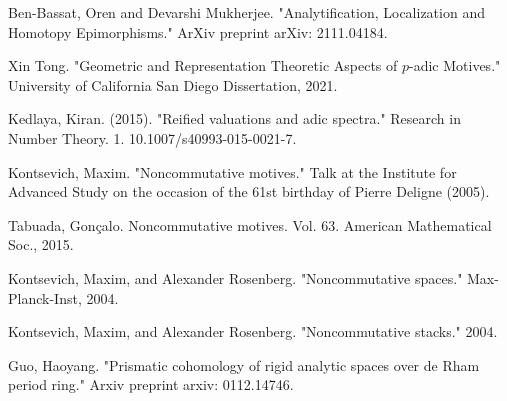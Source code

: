 \documentclass[11pt]{book}
\theoremstyle{definition}
\numberwithin{equation}{section}
\begin{document}
\begin{thebibliography}{10}
 Ben-Bassat, Oren and Devarshi Mukherjee.  "Analytification, Localization and Homotopy Epimorphisms." ArXiv preprint arXiv: 2111.04184.


 Xin Tong. "Geometric and Representation Theoretic Aspects of $p$-adic Motives." University of California San Diego Dissertation, 2021.

 Kedlaya, Kiran. (2015). "Reified valuations and adic spectra." Research in Number Theory. 1. 10.1007/s40993-015-0021-7. 

 Kontsevich, Maxim. "Noncommutative motives." Talk at the Institute for Advanced Study on the occasion of the 61st birthday of Pierre Deligne (2005).

 Tabuada, Gon\c{c}alo. Noncommutative motives. Vol. 63. American Mathematical Soc., 2015.

 Kontsevich, Maxim, and Alexander Rosenberg. "Noncommutative spaces." Max-Planck-Inst, 2004.

 Kontsevich, Maxim, and Alexander Rosenberg. "Noncommutative stacks." 2004.

 Guo, Haoyang. "Prismatic cohomology of rigid analytic spaces over de Rham period ring." Arxiv preprint arxiv: 0112.14746.



\



\end{thebibliography}
\end{document}
